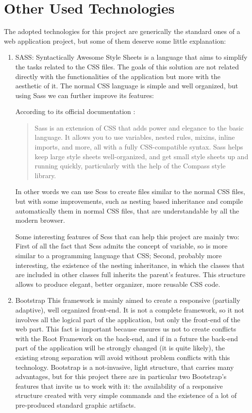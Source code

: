  
\section{Other Used Technologies}

The adopted technologies for this project are generically the standard ones of a web application project, but some of them deserve some little explanation:

\begin{enumerate}

\item
SASS:
Syntactically Awesome Style Sheets is a language that aims to simplify the tasks related to the CSS files. The goals of this solution are not related directly with the functionalities of the application but more with the aesthetic of it.
The normal CSS language is simple and well organized, but using Sass we can further improve its features:

According to its official documentation :
\begin{quote}
Sass is an extension of CSS that adds power and elegance to the basic language. It allows you to use variables, nested rules, mixins, inline imports, and more, all with a fully CSS-compatible syntax. Sass helps keep large style sheets well-organized, and get small style sheets up and running quickly, particularly with the help of the Compass style library.

\end{quote}

In other words we can use Scss to create files similar to the normal CSS files, but with some improvements, such as nesting based inheritance and compile automatically them in normal CSS files, that are understandable by all the modern browser.

Some interesting features of Scss that can help this project are mainly two:
First of all the fact that Scss admits the concept of variable, so is more similar to a programming language that CSS; Second, probably more interesting, the existence of the nesting inheritance, in which the classes that are included in other classes full inherits the parent's features. This structure allows to produce elegant, better organizer, more reusable CSS code.

\item
Bootstrap
This framework is mainly aimed to create a responsive (partially adaptive), well organized front-end. It is not a complete framework, so it not involves all the logical part of the application, but only the front-end of the web part. This fact is important because ensures us not to create conflicts with the Root Framework on the back-end, and if in a future the back-end part of the application will be strongly changed (it is quite likely), the existing strong separation will avoid without problem conflicts with this technology. Bootstrap is a not-invasive, light structure, that carries many advantages, but for this project there are in particular two Bootstrap's features that invite us to work with it: the availability of a responsive structure created with very simple commands and the existence of a lot of pre-produced standard graphic artifacts. 


\end{enumerate}
